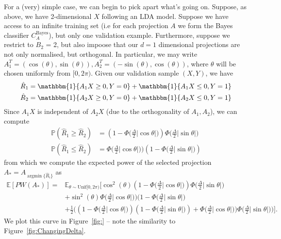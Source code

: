 \documentclass[12pt]{article}
\DeclareMathOperator*{\argmin}{argmin}
\begin{document}
For a (very) simple case, we can begin to pick apart what's going on. Suppose, as above, we have 2-dimensional $X$ following an LDA model. Suppose we have access to an infinite training set (i.e for each projection $A$ we form the Bayes classifier $C_A^{\text{Bayes}}$), but only one validation example. Furthermore, suppose we restrict to $B_2$ = 2, but also impoose that our $d=1$ dimensional projections are not only normalised, but orthogonal. In particular, we may write $A_1^T = (\cos(\theta), \sin(\theta)), A_2^T = (-\sin(\theta), \cos(\theta))$, where $\theta$ will be chosen uniformly from $[0, 2\pi)$. Given our validation sample $(X, Y)$, we have
\begin{align*}
    \hat{R}_1 & = \mathbbm{1}\{ A_1X \geq 0, Y = 0 \} + \mathbbm{1}\{ A_1X \leq 0, Y = 1 \} \\
    \hat{R}_2 & = \mathbbm{1}\{ A_2X \geq 0, Y = 0 \} + \mathbbm{1}\{ A_2X \leq 0, Y = 1 \}
\end{align*}
Since $A_1X$ is independent of $A_2X$ (due to the orthogonality of $A_1, A_2$), we can compute 
\begin{align*}
    \mathbb{P}(\hat{R}_1 \geq \hat{R}_2) & = (1 - \Phi\big(\frac{\Delta}{2}|\cos\theta|\big))\Phi\big(\frac{\Delta}{2}|\sin\theta|\big) \\
    \mathbb{P}(\hat{R}_1 \leq \hat{R}_2) & = \Phi\big(\frac{\Delta}{2}|\cos\theta|\big))(1-\Phi\big(\frac{\Delta}{2}|\sin\theta|\big)) %
\end{align*}
from which we compute the expected power of the selected projection $A_* = A_{\argmin \{ \hat{R}_i\}}$ as 
\begin{align*}
\mathbb{E}[PW(A_*)] = & \mathbb{E}_{\theta \sim \text{Unif}[0, 2\pi)}[\cos^2(\theta) (1 - \Phi\big(\frac{\Delta}{2}|\cos\theta|\big))\Phi\big(\frac{\Delta}{2}|\sin\theta|\big)\\ 
 &+ \sin^2(\theta) \Phi\big(\frac{\Delta}{2}|\cos\theta|\big))(1-\Phi\big(\frac{\Delta}{2}|\sin\theta|\big) \\
 &+ \frac{1}{2} \Big( (1 - \Phi\big(\frac{\Delta}{2}|\cos\theta|\big))(1-\Phi\big(\frac{\Delta}{2}|\sin\theta|\big)) + 
    \Phi\big(\frac{\Delta}{2}|\cos\theta|\big))\Phi\big(\frac{\Delta}{2}|\sin\theta|\big) \Big)].  
    \end{align*}
We plot this curve in Figure~\ref{fig:} -- note the similarity to Figure~\ref{fig:ChangingDelta}.
\end{document}
